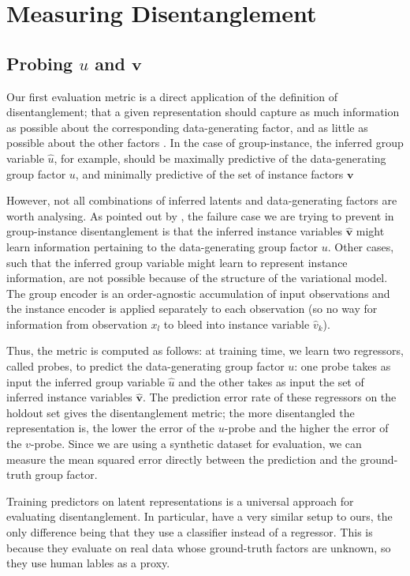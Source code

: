 \documentclass[nohyperref]{article}
\theoremstyle{plain}
\theoremstyle{definition}
\theoremstyle{remark}
\begin{document}
\section{Measuring Disentanglement}


\subsection{Probing $u$ and $\mathbf{v}$}

Our first evaluation metric is a direct application of the definition of disentanglement; that a given representation should capture as much information as possible about the corresponding data-generating factor,  and as little as possible about the other factors \citep{Locatello2020WeaklySupervisedDW}.  In the case of group-instance,  the inferred group variable $\hat{u}$, for example, should be maximally predictive of the data-generating group factor $u$, and minimally predictive of the set of instance factors $\mathbf{v}$

However, not all combinations of inferred latents and data-generating factors are worth analysing. As pointed out by \citet{Nmeth2020AdversarialDW}, the failure case we are trying to prevent in group-instance disentanglement is that the inferred instance variables $\hat{\mathbf{v}}$ might learn information pertaining to the data-generating group factor $u$. Other cases, such that the inferred group variable might learn to represent instance information, are not possible because of the structure of the variational model. The group encoder is an order-agnostic accumulation of input observations and the instance encoder is applied separately to each observation (so no way for information from observation $x_l$ to bleed into instance variable $\hat{v}_k$).

Thus, the metric is computed as follows: at training time, we learn two regressors, called probes,  to predict the data-generating group factor $u$: one probe takes as input the inferred group variable $\hat{u}$ and the other takes as input the set of inferred instance variables $\hat{\mathbf{v}}$. The prediction error rate of these regressors on the holdout set gives the disentanglement metric; the more disentangled the representation is, the lower the error of the $u$-probe and the higher the error of the $v$-probe. Since we are using a synthetic dataset for evaluation, we can measure the mean squared error directly between the prediction and the ground-truth group factor.

Training predictors on latent representations is a universal approach for evaluating disentanglement.  In particular, \citet{Bouchacourt2018MultiLevelVA, Nmeth2020AdversarialDW} have a very similar setup to ours, the only difference being that they use a classifier instead of a regressor. This is because they evaluate on real data whose ground-truth factors are unknown, so they use human lables as a proxy.
\end{document}
